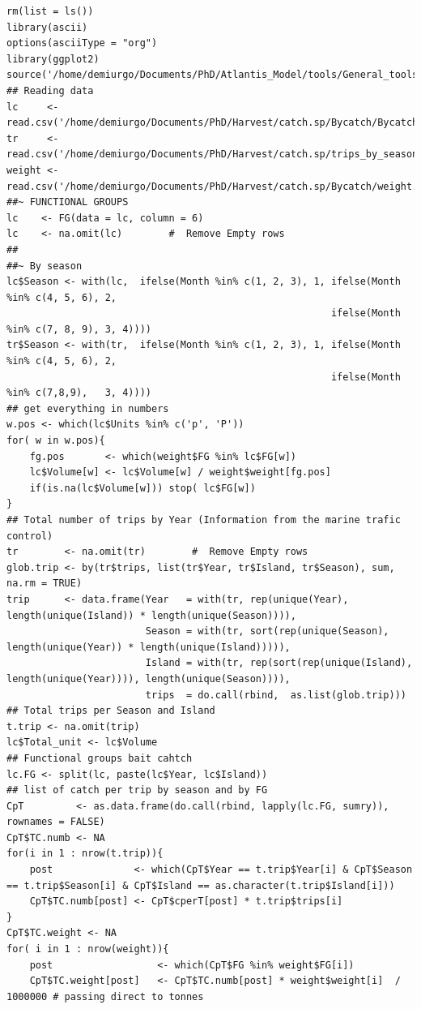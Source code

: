 \documentclass[11pt]{article}
\begin{document}
\begin{itemize}
\begin{itemize}
\begin{verbatim}
rm(list = ls())
library(ascii)
options(asciiType = "org")
library(ggplot2)
source('/home/demiurgo/Documents/PhD/Atlantis_Model/tools/General_tools/Atlantis_tools.R')
## Reading data
lc     <- read.csv('/home/demiurgo/Documents/PhD/Harvest/catch.sp/Bycatch/Bycatch.csv')
tr     <- read.csv('/home/demiurgo/Documents/PhD/Harvest/catch.sp/trips_by_season.csv')
weight <- read.csv('/home/demiurgo/Documents/PhD/Harvest/catch.sp/Bycatch/weight.csv')
##~ FUNCTIONAL GROUPS
lc    <- FG(data = lc, column = 6)
lc    <- na.omit(lc)        #  Remove Empty rows
##
##~ By season
lc$Season <- with(lc,  ifelse(Month %in% c(1, 2, 3), 1, ifelse(Month %in% c(4, 5, 6), 2,
                                                        ifelse(Month %in% c(7, 8, 9), 3, 4))))
tr$Season <- with(tr,  ifelse(Month %in% c(1, 2, 3), 1, ifelse(Month %in% c(4, 5, 6), 2,
                                                        ifelse(Month %in% c(7,8,9),   3, 4))))
## get everything in numbers
w.pos <- which(lc$Units %in% c('p', 'P'))
for( w in w.pos){
    fg.pos       <- which(weight$FG %in% lc$FG[w])
    lc$Volume[w] <- lc$Volume[w] / weight$weight[fg.pos]
    if(is.na(lc$Volume[w])) stop( lc$FG[w])
}
## Total number of trips by Year (Information from the marine trafic control)
tr        <- na.omit(tr)        #  Remove Empty rows
glob.trip <- by(tr$trips, list(tr$Year, tr$Island, tr$Season), sum, na.rm = TRUE)
trip      <- data.frame(Year   = with(tr, rep(unique(Year), length(unique(Island)) * length(unique(Season)))),
                        Season = with(tr, sort(rep(unique(Season), length(unique(Year)) * length(unique(Island))))),
                        Island = with(tr, rep(sort(rep(unique(Island), length(unique(Year)))), length(unique(Season)))),
                        trips  = do.call(rbind,  as.list(glob.trip)))
## Total trips per Season and Island
t.trip <- na.omit(trip)
lc$Total_unit <- lc$Volume
## Functional groups bait cahtch
lc.FG <- split(lc, paste(lc$Year, lc$Island))
## list of catch per trip by season and by FG
CpT         <- as.data.frame(do.call(rbind, lapply(lc.FG, sumry)), rownames = FALSE)
CpT$TC.numb <- NA
for(i in 1 : nrow(t.trip)){
    post              <- which(CpT$Year == t.trip$Year[i] & CpT$Season == t.trip$Season[i] & CpT$Island == as.character(t.trip$Island[i]))
    CpT$TC.numb[post] <- CpT$cperT[post] * t.trip$trips[i]
}
CpT$TC.weight <- NA
for( i in 1 : nrow(weight)){
    post                  <- which(CpT$FG %in% weight$FG[i])
    CpT$TC.weight[post]   <- CpT$TC.numb[post] * weight$weight[i]  / 1000000 # passing direct to tonnes

\end{verbatim}
\end{itemize}
\end{itemize}
\end{document}
